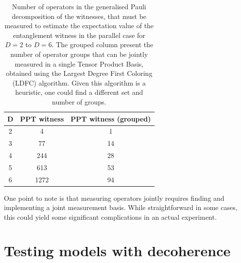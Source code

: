 \documentclass[%
 12pt,
 superscriptaddress,
 amsmath,
 amssymb,
 onecolumn,
 longbibliography
]{revtex4-2}
\begin{document}
\begin{table}
\begin{ruledtabular}
\begin{tabular}{ ccc }
  D & PPT witness & PPT witness (grouped) \\
  \hline
  2 & 4 & 1   \\
  3 & 77 & 14  \\
  4 & 244 & 28 \\  
  5 & 613 & 53 \\
  6 & 1272 & 94\\  
\end{tabular}
\end{ruledtabular}
\caption{\label{tab:table1} Number of operators in the generalised Pauli decomposition of the witnesses, that must be measured to estimate the expectation value of the entanglement witness in the parallel case for $D=2$ to $D=6$. The grouped column present the number of operator groups that can be jointly measured in a single Tensor Product Basis, obtained using the Largest Degree First Coloring (LDFC) algorithm. Given this algorithm is a heuristic, one could find a different set and number of groups.}
\end{table}
\indent One point to note is that measuring operators jointly requires finding and implementing a joint measurement basis. While straightforward in some cases, this could yield some significant complications in an actual experiment.\\

\section{Testing models with decoherence \label{sec:decoherence}}
\end{document}
